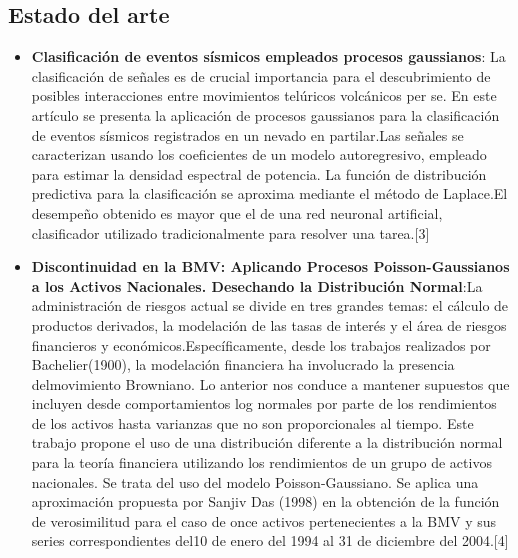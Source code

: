 \documentclass[12pt,a4paper]{article}
\begin{document}
\begin{multicols}{2}
\section{Estado del arte}
    \begin{itemize}
        \item \textbf{Clasificación de eventos sísmicos empleados  procesos gaussianos}: La clasificación de señales es de crucial  importancia para el descubrimiento de posibles interacciones entre movimientos telúricos volcánicos per se. En este artículo  se presenta la aplicación de procesos gaussianos para la clasificación de eventos sísmicos registrados en un nevado en partilar.Las señales se caracterizan usando los coeficientes  de un modelo autoregresivo, empleado para estimar la densidad espectral de potencia. La función de distribución predictiva para la clasificación se aproxima mediante el método de Laplace.El desempeño obtenido es mayor que el de una red neuronal artificial, clasificador  utilizado tradicionalmente para resolver una tarea.[3]\\
        \item \textbf{Discontinuidad en la BMV: Aplicando Procesos Poisson-Gaussianos a los Activos Nacionales. Desechando la Distribución Normal}:La administración de riesgos actual se divide en tres grandes temas: el cálculo de productos derivados, la modelación de las tasas de interés y el área de riesgos financieros y económicos.Específicamente, desde los trabajos realizados por Bachelier(1900), la modelación financiera ha involucrado la presencia delmovimiento Browniano. Lo anterior nos conduce a mantener supuestos que incluyen desde comportamientos log normales por parte de los rendimientos de los activos hasta varianzas que no son proporcionales al tiempo. Este trabajo propone el uso de una distribución diferente a la distribución normal para la teoría financiera utilizando los rendimientos de un grupo de activos nacionales. Se trata del uso del modelo Poisson-Gaussiano. Se aplica una aproximación propuesta por Sanjiv Das (1998) en la obtención de la función de verosimilitud para el caso de once activos pertenecientes a la BMV y sus series correspondientes del10 de enero del 1994 al 31 de diciembre del 2004.[4]\\

\end{itemize}
\end{multicols}
\end{document}
